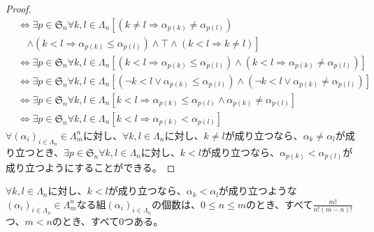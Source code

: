 \documentclass[dvipdfmx]{jsarticle}
\begin{document}
\begin{proof}
\begin{align*}
&\Leftrightarrow \exists p \in \mathfrak{S}_{n}\forall k,l \in \varLambda_{n}\left[ \left( k \neq l \Rightarrow \alpha_{p(k)} \neq \alpha_{p(l)} \right) \right. \\
&\quad \left. \land \left( k < l \Rightarrow \alpha_{p(k)} \leq \alpha_{p(l)} \right) \land \top \land (k < l \Rightarrow k \neq l) \right]\\
&\Leftrightarrow \exists p \in \mathfrak{S}_{n}\forall k,l \in \varLambda_{n}\left[ \left( k < l \Rightarrow \alpha_{p(k)} \leq \alpha_{p(l)} \right) \land \left( k < l \Rightarrow \alpha_{p(k)} \neq \alpha_{p(l)} \right) \right]\\
&\Leftrightarrow \exists p \in \mathfrak{S}_{n}\forall k,l \in \varLambda_{n}\left[ \left( \neg k < l \vee \alpha_{p(k)} \leq \alpha_{p(l)} \right) \land \left( \neg k < l \vee \alpha_{p(k)} \neq \alpha_{p(l)} \right) \right]\\
&\Leftrightarrow \exists p \in \mathfrak{S}_{n}\forall k,l \in \varLambda_{n}\left[ k < l \Rightarrow \alpha_{p(k)} \leq \alpha_{p(l)} \land \alpha_{p(k)} \neq \alpha_{p(l)} \right]\\
&\Leftrightarrow \exists p \in \mathfrak{S}_{n}\forall k,l \in \varLambda_{n}\left[ k < l \Rightarrow \alpha_{p(k)} < \alpha_{p(l)} \right]
\end{align*}
$\forall\left( \alpha_{i} \right)_{i \in \varLambda_{n}} \in \varLambda_{m}^{n}$に対し、$\forall k,l \in \varLambda_{n}$に対し、$k \neq l$が成り立つなら、$\alpha_{k} \neq \alpha_{l}$が成り立つとき、$\exists p \in \mathfrak{S}_{n}\forall k,l \in \varLambda_{n}$に対し、$k < l$が成り立つなら、$\alpha_{p(k)} < \alpha_{p(l)}$が成り立つようにすることができる。
\end{proof}
\begin{thm}\label{2.1.10.12}
$\forall k,l \in \varLambda_{n}$に対し、$k < l$が成り立つなら、$\alpha_{k} < \alpha_{l}$が成り立つような$\left( \alpha_{i} \right)_{i \in \varLambda_{n}} \in \varLambda_{m}^{n}$なる組$\left( \alpha_{i} \right)_{i \in \varLambda_{n}}$の個数は、$0 \leq n \leq m$のとき、すべて$\frac{m!}{n!(m - n)!}$つ、$m < n$のとき、すべて$0$つある。
\end{thm}
\end{document}
